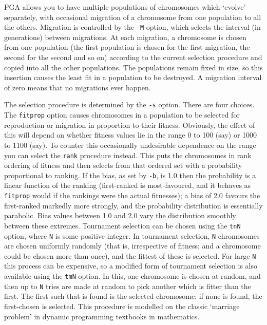 PGA allows you to have multiple populations of chromosomes which
`evolve' separately, with occasional migration of a chromosome
from one population to all the others. Migration is controlled
by the \verb|-M| option, which selects the interval (in generations)
between migrations. At each migration, a chromosome is chosen
from one population (the first population is chosen for the first
migration, the second for the second and so on) according to the
current selection procedure and copied into all the other populations.
The populations remain fixed in size, so this insertion causes the
least fit in a population to be destroyed. A migration interval of
zero means that no migrations ever happen.

The selection procedure is determined by the \verb|-s| option. There
are four choices. The \verb|fitprop| option causes chromosomes in a
population to be selected for reproduction or migration in proportion
to their fitness. Obviously, the effect of this will depend on whether
fitness values lie in the range 0 to 100 (say) or 1000 to 1100 (say).
To counter this occasionally undesirable dependence on the range you
can select the \verb|rank| procedure instead. This puts the
chromosomes in rank ordering of fitness and then selects from that
ordered set with a probability proportional to ranking. If the bias,
as set by \verb|-b|, is 1.0 then the probability is a linear function
of the ranking (first-ranked is most-favoured, and it behaves as
\verb|fitprop| would if the rankings were the actual fitnesses); a
bias of 2.0 favours the first-ranked markedly more strongly, and the
probability distribution is essentially parabolic. Bias values between
1.0 and 2.0 vary the distribution smoothly between these extremes.
Tournament selection can be chosen using the \verb|tnN| option, where
\verb|N| is some positive integer. In tournament selection, \verb|N|
chromosomes are chosen uniformly randomly (that is, irrespective of
fitness; and a chromosome could be chosen more than once), and the
fittest of these is selected. For large \verb|N| this process can
be expensive, so a modified form of tournament selection is also
available using the \verb|tmN| option. In this, one chromosome is
chosen at random, and then up to \verb|N| tries are made at random
to pick another which is fitter than the first. The first such that is
found is the selected chromosome; if none is found, the first-chosen
is selected. This procedure is modelled on the classic `marriage
problem' in dynamic programming textbooks in mathematics.

